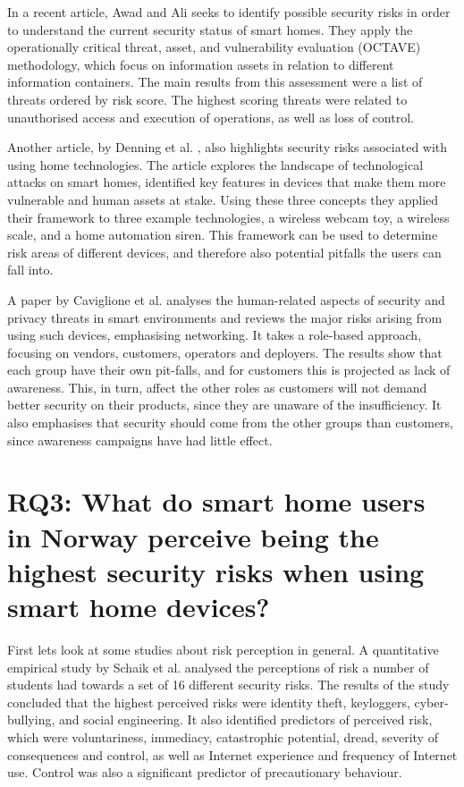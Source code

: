 In a recent article, Awad and Ali \cite{Awad2018} seeks to identify possible security risks in order to understand the current security status of smart homes. They apply the operationally critical threat, asset, and vulnerability evaluation (OCTAVE) methodology, which focus on information assets in relation to different information containers. The main results from this assessment were a list of threats ordered by risk score. The highest scoring threats were related to unauthorised access and execution of operations, as well as loss of control. 

Another article, by Denning et al. \cite{Denning:2013:CSM:2398356.2398377}, also highlights security risks associated with using home technologies. The article explores the landscape of technological attacks on smart homes, identified key features in devices that make them more vulnerable and human assets at stake. Using these three concepts they applied their framework to three example technologies, a wireless webcam toy, a wireless scale, and a home automation siren. This framework can be used to determine risk areas of different devices, and therefore also potential pitfalls the users can fall into. 

A paper by Caviglione et al. \cite{Caviglione2015} analyses the human-related aspects of security and privacy threats in smart environments and reviews the major risks arising from using such devices, emphasising networking. It takes a role-based approach, focusing on vendors, customers, operators and deployers. The results show that each group have their own pit-falls, and for customers this is projected as lack of awareness. This, in turn, affect the other roles as customers will not demand better security on their products, since they are unaware of the insufficiency. It also emphasises that security should come from the other groups than customers, since awareness campaigns have had little effect. 

\section{RQ3: What do smart home users in Norway perceive being the highest security risks when using smart home devices?}
First lets look at some studies about risk perception in general. A quantitative empirical study by Schaik et al. \cite{Schaik2017} analysed the perceptions of risk a number of students had towards a set of 16 different security risks. The results of the study concluded that the highest perceived risks were identity theft, keyloggers, cyber-bullying, and social engineering. It also identified predictors of perceived risk, which were voluntariness, immediacy, catastrophic potential, dread, severity of consequences and control, as well as Internet experience and frequency of Internet use. Control was also a significant predictor of precautionary behaviour. 

